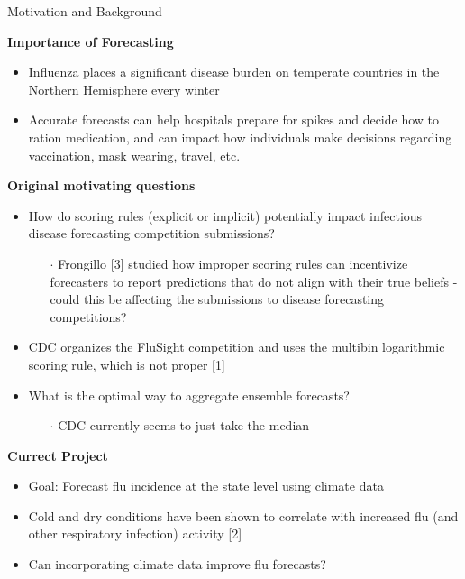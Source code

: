 
\begin{block}{Motivation and Background}
	
\textbf{Importance of Forecasting}
\begin{itemize}
	\item Influenza places a significant disease burden on temperate countries in the Northern Hemisphere every winter
	\item Accurate forecasts can help hospitals prepare for spikes and decide how to ration medication, and can impact how individuals make decisions regarding vaccination, mask wearing, travel, etc.
\end{itemize}
	
\textbf{Original motivating questions}
	\begin{itemize}
		\item How do scoring rules (explicit or implicit) potentially impact infectious disease forecasting competition submissions?
		\begin{itemize}
			\item[$\cdot$] Frongillo [3] studied how improper scoring rules can incentivize forecasters to report predictions that do not align with their true beliefs - could this be affecting the submissions to disease forecasting competitions?
		\end{itemize}
	\item CDC organizes the FluSight competition and uses the multibin logarithmic scoring rule, which is not proper [1]
		\item What is the optimal way to aggregate ensemble forecasts? 
		\begin{itemize}
			\item[$\cdot$] CDC currently seems to just take the median
		\end{itemize}
	\end{itemize}	

\textbf{Currect Project}
\begin{itemize}
	\item Goal: Forecast flu incidence at the state level using climate data
	\item Cold and dry conditions have been shown to correlate with increased flu (and other respiratory infection) activity [2]
	\item  Can incorporating climate data improve flu forecasts? 
\end{itemize}
\end{block}

